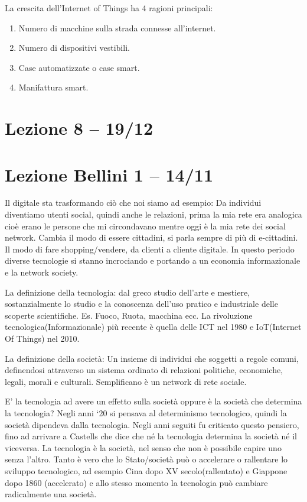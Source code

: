 \documentclass[]{article}
\begin{document}
La crescita dell'Internet of Things ha 4 ragioni principali:

\begin{enumerate}
	\def\labelenumi{\arabic{enumi}.}
	 
	\item
	Numero di macchine sulla strada connesse all'internet.
	\item
	Numero di dispositivi vestibili.
	\item
	Case automatizzate o case smart.
	\item
	Manifattura smart.
\end{enumerate}
\section*{Lezione 8 -- 19/12}
\section*{Lezione Bellini 1 -- 14/11}

Il digitale sta trasformando ciò che noi siamo ad esempio: Da individui
diventiamo utenti social, quindi anche le relazioni, prima la mia rete
era analogica cioè erano le persone che mi circondavano mentre oggi è la
mia rete dei social network. Cambia il modo di essere cittadini, si
parla sempre di più di e-cittadini. Il modo di fare shopping/vendere, da
clienti a cliente digitale. In questo periodo diverse tecnologie si
stanno incrociando e portando a un economia informazionale e la network
society.

La definizione della tecnologia: dal greco studio dell'arte e mestiere,
sostanzialmente lo studio e la conoscenza dell'uso pratico e industriale
delle scoperte scientifiche. Es. Fuoco, Ruota, macchina ecc. La
rivoluzione tecnologica(Informazionale) più recente è quella delle ICT
nel 1980 e IoT(Internet Of Things) nel 2010.

La definizione della società: Un insieme di individui che soggetti a
regole comuni, definendosi attraverso un sistema ordinato di relazioni
politiche, economiche, legali, morali e culturali. Semplificano è un
network di rete sociale.

E' la tecnologia ad avere un effetto sulla società oppure è la società
che determina la tecnologia? Negli anni `20 si pensava al determinismo
tecnologico, quindi la società dipendeva dalla tecnologia. Negli anni
seguiti fu criticato questo pensiero, fino ad arrivare a Castells che
dice che né la tecnologia determina la società né il viceversa. La
tecnologia è la società, nel senso che non è possibile capire uno senza
l'altro. Tanto è vero che lo Stato/società può o accelerare o rallentare
lo sviluppo tecnologico, ad esempio Cina dopo XV secolo(rallentato) e
Giappone dopo 1860 (accelerato) e allo stesso momento la tecnologia può
cambiare radicalmente una società.
\end{document}
